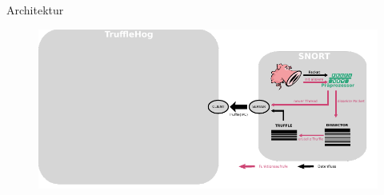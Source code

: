 \begin{frame}{Architektur}
    \begin{figure}
    	\centering
    	\includegraphics[width=\textwidth]{./images/7.pdf}
    \end{figure}
\end{frame}
